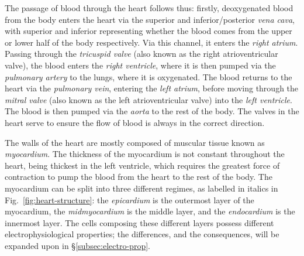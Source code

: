 \documentclass[../thesis-main.tex]{subfiles}
\begin{document}
 The passage of blood through the heart follows thus: firstly, deoxygenated blood from the body enters the heart via the superior and inferior/posterior \emph{vena cava}, with superior and inferior representing whether the blood comes from the upper or lower half of the body respectively. Via this channel, it enters the \emph{right atrium}. Passing through the \emph{tricuspid valve} (also known as the right atrioventricular valve), the blood enters the \emph{right ventricle}, where it is then pumped via the \emph{pulmonary artery} to the lungs, where it is oxygenated. The blood returns to the heart via the \emph{pulmonary vein}, entering the \emph{left atrium}, before moving through the \emph{mitral valve} (also known as the left atrioventricular valve) into the \emph{left ventricle}. The blood is then pumped via the \emph{aorta} to the rest of the body. The valves in the heart serve to ensure the flow of blood is always in the correct direction.
 
 The walls of the heart are mostly composed of muscular tissue known as \emph{myocardium}. The thickness of the myocardium is not constant throughout the heart, being thickest in the left ventricle, which requires the greatest force of contraction to pump the blood from the heart to the rest of the body. The myocardium can be split into three different regimes, as labelled in italics in Fig.~\ref{fig:heart-structure}: the \emph{epicardium} is the outermost layer of the myocardium, the \emph{midmyocardium} is the middle layer, and the \emph{endocardium} is the innermost layer. The cells composing these different layers possess different electrophysiological properties; the differences, and the consequences, will be expanded upon in \S\ref{subsec:electro-prop}.
 
\end{document}
